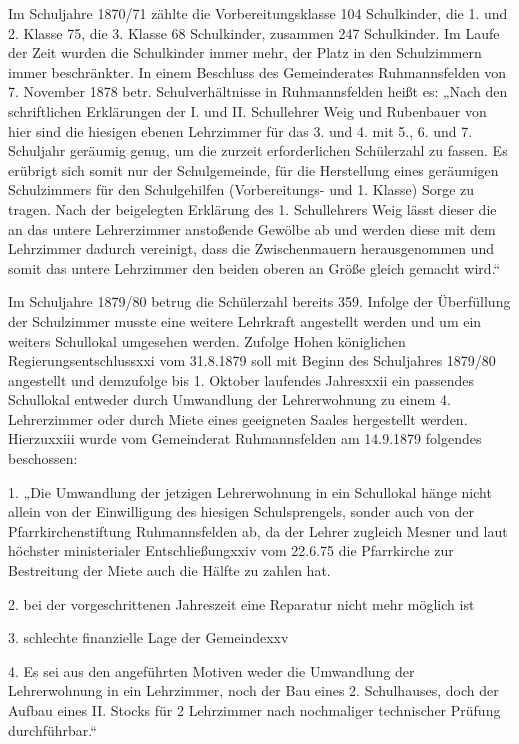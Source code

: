 \documentclass[12pt,a4paper]{book}
\begin{document}
Im Schuljahre 1870/71 zählte die Vorbereitungsklasse 104 Schulkinder, die 1. und
2. Klasse 75, die 3. Klasse 68 Schulkinder, zusammen 247 Schulkinder. Im Laufe
der Zeit wurden die Schulkinder immer mehr, der Platz in den Schulzimmern immer
beschränkter. In einem Beschluss des Gemeinderates Ruhmannsfelden von 7.
November 1878 betr. Schulverhältnisse in Ruhmannsfelden heißt es: „Nach den
schriftlichen Erklärungen der I. und II. Schullehrer Weig und Rubenbauer von
hier sind die hiesigen ebenen Lehrzimmer für das 3. und 4. mit 5., 6. und 7.
Schuljahr geräumig genug, um die zurzeit erforderlichen Schülerzahl zu fassen.
Es erübrigt sich somit nur der Schulgemeinde, für die Herstellung eines
geräumigen Schulzimmers für den Schulgehilfen (Vorbereitungs- und 1. Klasse)
Sorge zu tragen. Nach der beigelegten Erklärung des 1. Schullehrers Weig lässt
dieser die an das untere Lehrerzimmer anstoßende Gewölbe ab und werden diese mit
dem Lehrzimmer dadurch vereinigt, dass die Zwischenmauern herausgenommen und
somit das untere Lehrzimmer den beiden oberen an Größe gleich gemacht wird.“

Im Schuljahre 1879/80 betrug die Schülerzahl bereits 359. Infolge der
Überfüllung der Schulzimmer musste eine weitere Lehrkraft angestellt werden und
um ein weiters Schullokal umgesehen werden. Zufolge Hohen königlichen
Regierungsentschlussxxi vom 31.8.1879 soll mit Beginn des Schuljahres 1879/80
angestellt und demzufolge bis 1. Oktober laufendes Jahresxxii ein passendes
Schullokal entweder durch Umwandlung der Lehrerwohnung zu einem 4. Lehrerzimmer
oder durch Miete eines geeigneten Saales hergestellt werden. Hierzuxxiii wurde
vom Gemeinderat Ruhmannsfelden am 14.9.1879 folgendes beschossen:



1. „Die Umwandlung der jetzigen Lehrerwohnung in ein Schullokal hänge nicht
allein von der Einwilligung des hiesigen Schulsprengels, sonder auch von der
Pfarrkirchenstiftung Ruhmannsfelden ab, da der Lehrer zugleich Mesner und laut
höchster ministerialer Entschließungxxiv vom 22.6.75 die Pfarrkirche zur
Bestreitung der Miete auch die Hälfte zu zahlen hat.

2. bei der vorgeschrittenen Jahreszeit eine Reparatur nicht mehr möglich ist

3. schlechte finanzielle Lage der Gemeindexxv

4. Es sei aus den angeführten Motiven weder die Umwandlung der Lehrerwohnung in
ein Lehrzimmer, noch der Bau eines 2. Schulhauses, doch der Aufbau eines II.
Stocks für 2 Lehrzimmer nach nochmaliger technischer Prüfung durchführbar.“
\end{document}

